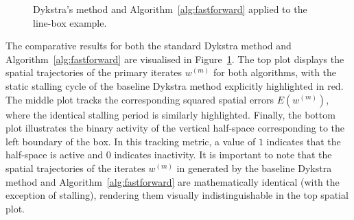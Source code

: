 \begin{figure}[b]
    \caption{Dykstra's method and Algorithm~\ref{alg:fastforward} applied to the line-box example.}
    \label{fig:stalling2}
\end{figure}

The comparative results for both the standard Dykstra method and Algorithm~\ref{alg:fastforward} are visualised in Figure~\ref{fig:stalling2}. The top plot displays the spatial trajectories of the primary iterates $w^{(m)}$ for both algorithms, with the static stalling cycle of the baseline Dykstra method explicitly highlighted in red. The middle plot tracks the corresponding squared spatial errors $E(w^{(m)})$, where the identical stalling period is similarly highlighted. Finally, the bottom plot illustrates the binary activity of the vertical half-space corresponding to the left boundary of the box. In this tracking metric, a value of $1$ indicates that the half-space is active and $0$ indicates inactivity. It is important to note that the spatial trajectories of the iterates $w^{(m)}$ in generated by the baseline Dykstra method and Algorithm~\ref{alg:fastforward} are mathematically identical (with the exception of stalling), rendering them visually indistinguishable in the top spatial plot. 

